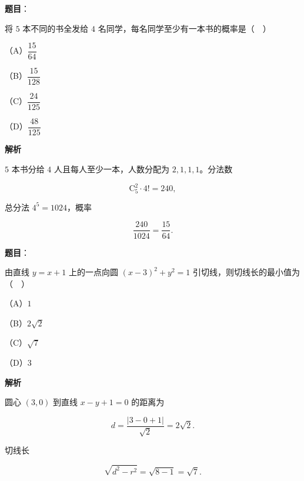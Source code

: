 \begin{answer}

\textbf{题目}：

将 $5$ 本不同的书全发给 $4$ 名同学，每名同学至少有一本书的概率是（　）

（A）$\dfrac{15}{64}$

（B）$\dfrac{15}{128}$

（C）$\dfrac{24}{125}$

（D）$\dfrac{48}{125}$

\textbf{解析}

$5$ 本书分给 $4$ 人且每人至少一本，人数分配为 $2,1,1,1$。分法数

\nopagebreak[4]
\[\mathrm C_5^2\cdot4!=240,\]

总分法 $4^5=1024$，概率

\nopagebreak[4]
\[\frac{240}{1024}=\frac{15}{64}.\]


\end{answer}
\begin{answer}

\textbf{题目}：

由直线 $y=x+1$ 上的一点向圆 $(x-3)^2+y^2=1$ 引切线，则切线长的最小值为（　）

（A）$1$

（B）$2\sqrt2$

（C）$\sqrt7$

（D）$3$

\textbf{解析}

圆心 $(3,0)$ 到直线 $x-y+1=0$ 的距离为

\nopagebreak[4]
\[d=\frac{|3-0+1|}{\sqrt2}=2\sqrt2.\]

切线长

\nopagebreak[4]
\[\sqrt{d^2-r^2}=\sqrt{8-1}=\sqrt7.\]


\end{answer}
